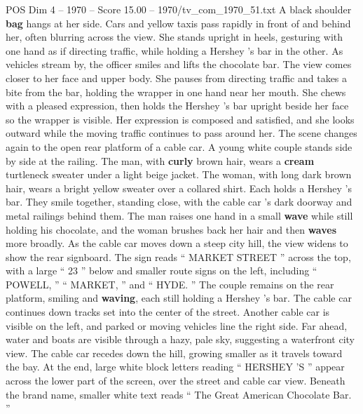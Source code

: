 \begin{textsample}{POS Dim 4 – 1970 – Score 15.00 – 1970/tv\_com\_1970\_51.txt}
A black shoulder \textbf{bag} hangs at her side.
Cars and yellow taxis pass rapidly in front of and behind her, often blurring across the view.
She stands upright in heels, gesturing with one hand as if directing traffic, while holding a Hershey ’s bar in the other.
As vehicles stream by, the officer smiles and lifts the chocolate bar.
The view comes closer to her face and upper body.
She pauses from directing traffic and takes a bite from the bar, holding the wrapper in one hand near her mouth.
She chews with a pleased expression, then holds the Hershey ’s bar upright beside her face so the wrapper is visible.
Her expression is composed and satisfied, and she looks outward while the moving traffic continues to pass around her.
The scene changes again to the open rear platform of a cable car.
A young white couple stands side by side at the railing.
The man, with \textbf{curly} brown hair, wears a \textbf{cream} turtleneck sweater under a light beige jacket.
The woman, with long dark brown hair, wears a bright yellow sweater over a collared shirt.
Each holds a Hershey ’s bar.
They smile together, standing close, with the cable car ’s dark doorway and metal railings behind them.
The man raises one hand in a small \textbf{wave} while still holding his chocolate, and the woman brushes back her hair and then \textbf{waves} more broadly.
As the cable car moves down a steep city hill, the view widens to show the rear signboard.
The sign reads “ MARKET STREET ” across the top, with a large “ 23 ” below and smaller route signs on the left, including “ POWELL, ” “ MARKET, ” and “ HYDE. ” The couple remains on the rear platform, smiling and \textbf{waving}, each still holding a Hershey ’s bar.
The cable car continues down tracks set into the center of the street.
Another cable car is visible on the left, and parked or moving vehicles line the right side.
Far ahead, water and boats are visible through a hazy, pale sky, suggesting a waterfront city view.
The cable car recedes down the hill, growing smaller as it travels toward the bay.
At the end, large white block letters reading “ HERSHEY ’S ” appear across the lower part of the screen, over the street and cable car view.
Beneath the brand name, smaller white text reads “ The Great American Chocolate Bar. ”

\end{textsample}
